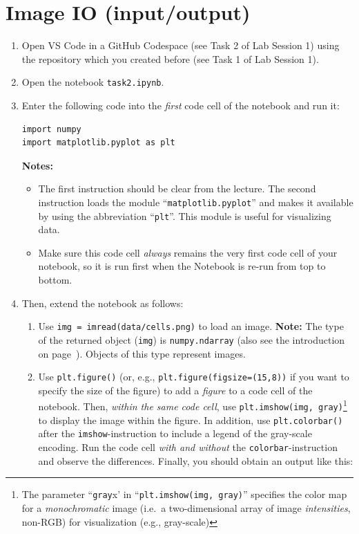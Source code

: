 \documentclass[12pt,a4paper]{article}
\begin{document}
\section{Image IO (input/output)}
\label{task:io}
\begin{enumerate}
    \item Open VS Code in a GitHub Codespace (see Task 2 of Lab Session 1) using the repository which you created before (see Task 1 of Lab Session 1).
    \item Open the notebook \texttt{task2.ipynb}.
    \item Enter the following code into the \emph{first} code cell of the notebook and run it:
\begin{Verbatim}[frame=single]
import numpy
import matplotlib.pyplot as plt
\end{Verbatim}
    \textbf{Notes:}
    \begin{itemize}
        \item The first instruction should be clear from the lecture. The second instruction loads the module ``\texttt{matplotlib.pyplot}'' and makes it available by using the abbreviation ``\texttt{plt}''. This module is useful for visualizing data.
        \item Make sure this code cell \emph{always} remains the very first code cell of your notebook, so it is run first when the Notebook is re-run from top to bottom.
    \end{itemize}
    \item Then, extend the notebook as follows:
    \begin{enumerate}
        \item Use \texttt{img = imread(\textquotesingle{}data/cells.png\textquotesingle)} to load an image. \textbf{Note:} The type of the returned object (\texttt{img}) is \texttt{numpy.ndarray} (also see the introduction on page~\pageref{sec:ndarray}). Objects of this type represent images.
        \item Use \texttt{plt.figure()} (or, e.g., \texttt{plt.figure(figsize=(15,8))} if you want to specify the size of the figure) to add a \emph{figure} to a code cell of the notebook. Then, \emph{within the same code cell}, use \texttt{plt.imshow(img, \textquotesingle{}gray\textquotesingle)}\footnote{The parameter ``\texttt{\textquotesingle{}gray\textquotesingle}x' in ``\texttt{plt.imshow(img, \textquotesingle{}gray\textquotesingle)}'' specifies the color map for a \emph{monochromatic} image (i.e.\ a two-dimensional array of image \emph{intensities}, non-RGB) for visualization (e.g., gray-scale)} to display the image within the figure. In addition, use \texttt{plt.colorbar()} after the \texttt{imshow}-instruction to include a legend of the gray-scale encoding. Run the code cell \emph{with and without} the \texttt{colorbar}-instruction and observe the differences. Finally, you should obtain an output like this:

\end{enumerate}
\end{enumerate}
\end{document}
